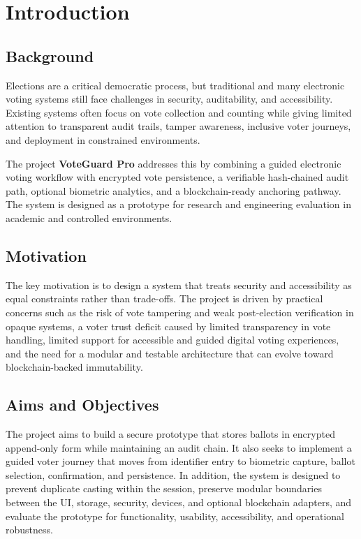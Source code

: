 \chapter{Introduction}

\section{Background}
Elections are a critical democratic process, but traditional and many electronic voting systems still face challenges in security, auditability, and accessibility. Existing systems often focus on vote collection and counting while giving limited attention to transparent audit trails, tamper awareness, inclusive voter journeys, and deployment in constrained environments.

The project \textbf{VoteGuard Pro} addresses this by combining a guided electronic voting workflow with encrypted vote persistence, a verifiable hash-chained audit path, optional biometric analytics, and a blockchain-ready anchoring pathway. The system is designed as a prototype for research and engineering evaluation in academic and controlled environments.

\section{Motivation}
The key motivation is to design a system that treats security and accessibility as equal constraints rather than trade-offs. The project is driven by practical concerns such as the risk of vote tampering and weak post-election verification in opaque systems, a voter trust deficit caused by limited transparency in vote handling, limited support for accessible and guided digital voting experiences, and the need for a modular and testable architecture that can evolve toward blockchain-backed immutability.

\section{Aims and Objectives}
The project aims to build a secure prototype that stores ballots in encrypted append-only form while maintaining an audit chain. It also seeks to implement a guided voter journey that moves from identifier entry to biometric capture, ballot selection, confirmation, and persistence. In addition, the system is designed to prevent duplicate casting within the session, preserve modular boundaries between the UI, storage, security, devices, and optional blockchain adapters, and evaluate the prototype for functionality, usability, accessibility, and operational robustness.

